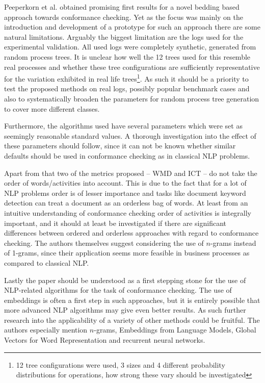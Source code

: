 \documentclass[runningheads]{template/llncs}
\begin{document}
Peeperkorn et al. obtained promising first results for a novel bedding based approach towards conformance checking.
Yet as the focus was mainly on the introduction and development of a prototype for such an approach there are some natural limitations.
Arguably the biggest limitation are the logs used for the experimental validation.
All used logs were completely synthetic, generated from random process trees.
It is unclear how well the 12 trees used for this resemble real processes and whether these tree configurations are sufficiently representative for the variation exhibited in real life trees\footnote{12 tree configurations were used, 3 sizes and 4 different probability distributions for operations, how strong these vary should be investigated}.
As such it should be a priority to test the proposed methods on real logs, possibly popular benchmark cases and also to systematically broaden the parameters for random process tree generation to cover more different classes.


Furthermore, the algorithms used have several parameters which were set as seemingly reasonable standard values.
A thorough investigation into the effect of these parameters should follow, since it can not be known whether similar defaults should be used in conformance checking  as in classical NLP problems.

Apart from that two of the metrics proposed -- WMD and ICT -- do not take the order of words/activities into account.
This is due to the fact that for a lot of NLP problems order is of lesser importance and tasks like document keyword detection can treat a document as an orderless bag of words.
At least from an intuitive understanding of conformance checking order of activities is integrally important, and it should at least be investigated if there are significant differences between ordered and orderless approaches with regard to conformance checking.
The authors themselves suggest considering the use of $n$-grams instead of 1-grams, since their application seems more feasible in business processes as compared to classical NLP.

Lastly the paper should be understood as a first stepping stone for the use of NLP-related algorithms for the task of conformance checking.
The use of embeddings is often a first step in such approaches, but it is entirely possible that more advanced NLP algorithms may give even better results.
As such further research into the applicability of a variety of other methods could be fruitful.
The authors especially mention $n$-grams, Embeddings from Language Models, Global Vectors for Word Representation and recurrent neural networks.

%
%
%


%
\end{document}
